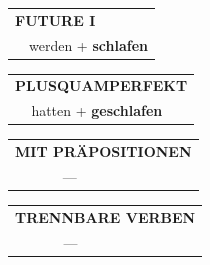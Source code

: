 \documentclass[10pt,a4paper]{revtex4-2}
\begin{document}
\begin{verbbox}
\begin{tabular}{rl}
    \multicolumn{2}{l}{\textbf{FUTURE I} }\\
  &  werden + \textbf{schlafen}\\
 
  \end{tabular}
\hfill
   \begin{tabular}{rl}
      \multicolumn{2}{l}{\textbf{PLUSQUAMPERFEKT}}\\
  &  hatten + \textbf{geschlafen}\\
  \end{tabular}
  
  \vspace{10pt}



\begin{tabular}{lll}
\multicolumn{3}{l}{\textbf{MIT PRÄPOSITIONEN}}\\
& ---\\
\end{tabular}
\hfill
\begin{tabular}{lll}
\multicolumn{3}{l}{\textbf{TRENNBARE VERBEN}}\\
& ---\\
\end{tabular}

  \vspace{-5pt}

\end{verbbox}
\end{document}
